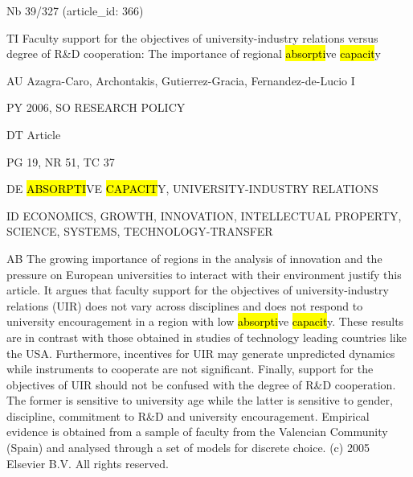 \documentclass[a4paper]{article}
\begin{document}
\vspace*{-2cm}
Nb \tabto{0cm}39/327 (article\_id: 366)\par
TI \tabto{0cm}Faculty support for the objectives of university-industry relations versus degree of R\&D cooperation: The importance of regional \hl{absorpti}ve \hl{capacit}y\par
AU \tabto{0cm}Azagra-Caro, Archontakis, Gutierrez-Gracia, Fernandez-de-Lucio I\par
PY \tabto{0cm}2006, SO RESEARCH POLICY\par
DT \tabto{0cm}Article\par
PG \tabto{0cm}19, NR 51, TC 37\par
DE \tabto{0cm}\hl{ABSORPTI}VE \hl{CAPACIT}Y, UNIVERSITY-INDUSTRY RELATIONS\par
ID \tabto{0cm}ECONOMICS, GROWTH, INNOVATION, INTELLECTUAL PROPERTY, SCIENCE, SYSTEMS, TECHNOLOGY-TRANSFER\par
AB \tabto{0cm}The growing importance of regions in the analysis of innovation and the pressure on European universities to interact with their environment justify this article. It argues that faculty support for the objectives of university-industry relations (UIR) does not vary across disciplines and does not respond to university encouragement in a region with low \hl{absorpti}ve \hl{capacit}y. These results are in contrast with those obtained in studies of technology leading countries like the USA. Furthermore, incentives for UIR may generate unpredicted dynamics while instruments to cooperate are not significant. Finally, support for the objectives of UIR should not be confused with the degree of R\&D cooperation. The former is sensitive to university age while the latter is sensitive to gender, discipline, commitment to R\&D and university encouragement. Empirical evidence is obtained from a sample of faculty from the Valencian Community (Spain) and analysed through a set of models for discrete choice. (c) 2005 Elsevier B.V. All rights reserved.\par
\clearpage
\end{document}
